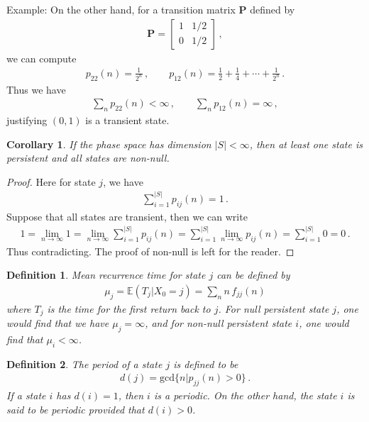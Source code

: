 \documentclass[11pt, onesided]{book}
\theoremstyle{break}
\theoremstyle{break}
\newtheorem{cor}{Corollary}[thm]
\newtheorem{defn}{Definition}[thm]
\newcommand{\bmat}[1]{\begin{bmatrix} #1 \end{bmatrix}}
\newcommand{\example}{\color{green}Example: \color{black}}
\begin{document}
\example On the other hand, for a transition matrix $\mathbf{P}$ defined by
\begin{align*}
\mathbf{P} = \bmat{1 & 1/2 \\ 0 & 1/2}\,,
\end{align*}
we can compute
\begin{align*}
p_{22}(n) = \frac{1}{2^n}\,,\qquad
p_{12}(n) = \frac{1}{2}+ \frac{1}{4} + \cdots + \frac{1}{2^n}\,.
\end{align*}
Thus we have
\begin{align*}
\sum_{n}p_{22}(n) <\infty\,,\qquad \sum_n p_{12}(n)=\infty\,,
\end{align*}
justifying $(0,1)$ is a transient state. 

\begin{cor}
If the phase space has dimension $|S| < \infty$, then at least one state is persistent and all states are non-null. 
\end{cor}
\begin{proof}
Here for state $j$, we have
\begin{align*}
\sum_{i=1}^{|S|} p_{ij}(n) = 1\,.
\end{align*}
Suppose that all states are transient, then we can write
\begin{align*}
1 = \lim_{n\to \infty}1 = \lim_{n\to \infty}\sum_{i=1}^{|S|}p_{ij}(n) = \sum_{i=1}^{|S|}\lim_{n\to \infty}p_{ij}(n) = \sum_{i=1}^{|S|}  0 = 0\,.
\end{align*}
Thus contradicting. The proof of non-null is left for the reader.
\end{proof}

\begin{defn}
Mean recurrence time for state $j$ can be defined by
\begin{align*}
\mu_j  = \mathbb{E}(T_j |X_0 = j) =\sum_{n}n\, f_{jj}(n) 
\end{align*}
where $T_j$ is the time for the first return back to $j$. For null persistent state $j$, one would find that we have $\mu_j = \infty$, and for non-null persistent state $i$, one would find that $\mu_i < \infty$. 
\end{defn}

\begin{defn}
The period of a state $j$ is defined to be
\begin{align*}
d(j) = \text{gcd}\{n | p_{jj}(n) > 0\}\,.
\end{align*}
If a state $i$ has $d(i) = 1$, then $i$ is a periodic. On the other hand, the state $i$ is said to be periodic  provided that $d(i) >0$. \\
\end{defn}
\end{document}
